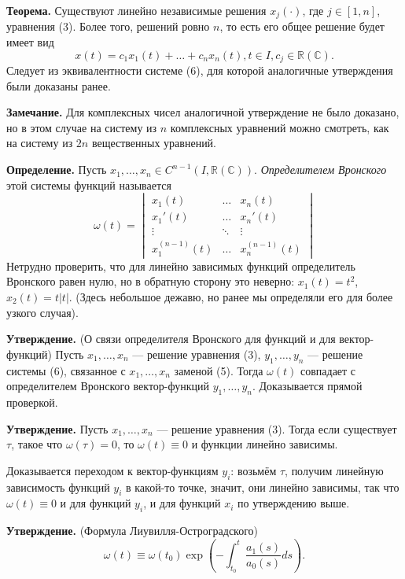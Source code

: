 \QED

\textbf{Теорема.} Существуют линейно независимые решения $x_j(\cdot)$, где $j \in [1, n]$, уравнения (3).
Более того, решений ровно $n$, то есть его общее решение будет имеет вид
\[
    x(t) = c_1x_1(t) + \dots + c_nx_n(t), t \in I, c_j \in \mathbb R (\mathbb C).
\]
Следует из эквивалентности системе (6), для которой аналогичные утверждения были доказаны ранее.

\QED

\textbf{Замечание.} Для комплексных чисел аналогичной утверждение не было доказано, но в этом случае на систему из $n$ комплексных уравнений можно смотреть, как на систему из $2n$ вещественных уравнений.

\textbf{Определение.} Пусть $x_1, \dots, x_n \in C^{n-1}(I, \mathbb R(\mathbb C))$.
\textit{Определителем Вронского} этой системы функций называется
\[
    \omega(t) =
    \begin{vmatrix}
        x_1(t) & \dots & x_n(t) \\
        x_1'(t) & \dots & x_n'(t) \\
        \vdots & \ddots & \vdots \\
        x_1^{(n-1)}(t) & \dots & x_n^{(n-1)}(t)
    \end{vmatrix}
\]
Нетрудно проверить, что для линейно зависимых функций определитель Вронского равен нулю, но в обратную сторону это неверно: $x_1(t) = t^2$, $x_2(t) = t|t|$.
(Здесь небольшое дежавю, но ранее мы определяли его для более узкого случая).

\textbf{Утверждение.} (О связи определителя Вронского для функций и для вектор-функций)
Пусть $x_1, \dots, x_n$ --- решение уравнения (3), $y_1, \dots, y_n$ --- решение системы (6), связанное с $x_1, \dots, x_n$ заменой (5).
Тогда $\omega(t)$ совпадает с определителем Вронского вектор-функций $y_1, \dots, y_n$.
Доказывается прямой проверкой.

\textbf{Утверждение.} Пусть $x_1, \dots, x_n$ --- решение уравнения (3).
Тогда если существует $\tau$, такое что $\omega(\tau) = 0$, то $\omega(t) \equiv 0$ и функции линейно зависимы.

Доказывается переходом к вектор-функциям $y_i$: возьмём $\tau$, получим линейную зависимость функций $y_i$ в какой-то точке, значит, они линейно зависимы, так что $\omega(t) \equiv 0$ и для функций $y_i$, и для функций $x_i$ по утверждению выше.

\textbf{Утверждение.} (Формула Лиувилля-Остроградского)
\[
    \omega(t) \equiv \omega(t_0) \exp \left( -\int_{t_0}^{t} \frac{a_1(s)}{a_0(s)}ds \right).
\]

